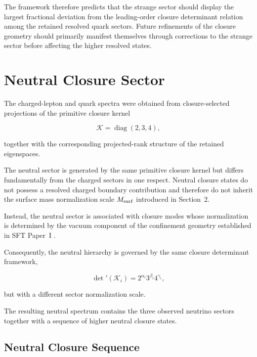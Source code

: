 \documentclass[11pt]{article}
\theoremstyle{definition}
\theoremstyle{remark}
\begin{document}
The framework therefore predicts that the strange sector should
display the largest fractional deviation from the leading-order
closure determinant relation among the retained resolved
quark sectors. Future refinements of the closure geometry should
primarily manifest themselves through corrections to the strange
sector before affecting the higher resolved states.



\section{Neutral Closure Sector}
\label{sec:neutral_closure_sector}

The charged-lepton and quark spectra were obtained from
closure-selected projections of the primitive closure kernel

\begin{equation}
\mathcal K =
\operatorname{diag}(2,3,4),
\end{equation}

together with the corresponding projected-rank structure of the
retained eigenspaces.

The neutral sector is generated by the same primitive closure
kernel but differs fundamentally from the charged sectors in one
respect. Neutral closure states do not possess a resolved
charged boundary contribution and therefore do not inherit the
surface mass normalization scale \(M_{\rm surf}\) introduced in
Section~2.

Instead, the neutral sector is associated with closure modes
whose normalization is determined by the vacuum component of the
confinement geometry established in SFT Paper~I
\cite{Egbon2025I}.

Consequently, the neutral hierarchy is governed by the same
closure determinant framework,

\begin{equation}
\det{}'(\mathcal K_i) =
2^{\alpha_i}
3^{\beta_i}
4^{\gamma_i},
\end{equation}

but with a different sector normalization scale.

The resulting neutral spectrum contains the three observed
neutrino sectors together with a sequence of higher neutral
closure states.


\subsection{Neutral Closure Sequence}
\label{subsec:neutral_closure_sequence}
\end{document}

